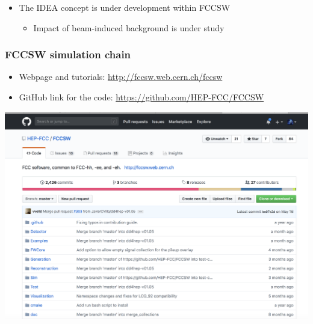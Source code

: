 \documentclass[hyperref={colorlinks=true,pdfpagelabels=false,linkcolor=black}, xcolor=dvipsnames,10pt]{beamer}
\begin{document}
\begin{frame}
  \vspace{0.5cm}
  \begin{itemize}
    \item The IDEA concept is under development within FCCSW
      \begin{itemize}
        \item Impact of beam-induced background is under study
      \end{itemize}
  \end{itemize}

\end{frame}

\begin{frame}
	\frametitle{FCCSW simulation chain}

  \vspace{0.5cm}

  \centering

    \vspace{1cm}
    \begin{itemize}
      \item Webpage and tutorials: \url{http://fccsw.web.cern.ch/fccsw}
      \item GitHub link for the code: \url{https://github.com/HEP-FCC/FCCSW}
    \end{itemize}

    \centering
		\includegraphics[width=\textwidth]{./figures/GitHub}
\end{frame}
\end{document}
